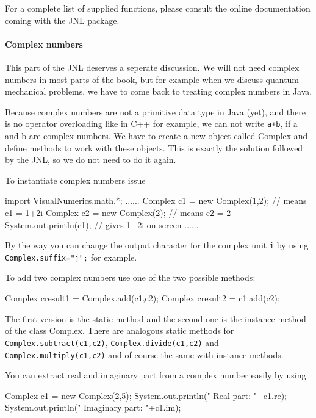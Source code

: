 For a complete list of supplied functions, please consult the online 
documentation coming with the JNL package.

\paragraph{Complex numbers}
This part of the JNL deserves a seperate discussion. We will not need
complex numbers in most parts of the book, but for example when
we discuss quantum mechanical problems, we have to come back to
treating complex numbers in Java.

Because complex numbers are not a primitive data type in Java (yet),
and there is no operator overloading like in C++ for example, we
can not write \verb|a+b|, if a and b are complex numbers. We have to
create a new object called Complex and define methods to work with
these objects. This is exactly the solution followed by the JNL,
so we do not need to do it again.

To instantiate complex numbers issue 
\begin{sverbatim}
import VisualNumerics.math.*;
  ......
  Complex c1 = new Complex(1,2); // means c1 = 1+2i  
  Complex c2 = new Complex(2);   // means c2 = 2  
  System.out.println(c1);  // gives   1+2i  on screen
  ......
\end{sverbatim}
By the way you can change the output character for the complex
unit \verb|i| by using \verb|Complex.suffix="j";| for example.

To add two complex numbers use one of the two possible methods:
\begin{sverbatim}
   Complex cresult1 = Complex.add(c1,c2);
   Complex cresult2 = c1.add(c2);
\end{sverbatim}
The first version is the static method and the second one is
the instance method of the class Complex. There are analogous
static methods for \verb|Complex.subtract(c1,c2)|, \verb|Complex.divide(c1,c2)|
and \verb|Complex.multiply(c1,c2)| and of course the same with
instance methods.

You can extract real and imaginary part from a complex number
easily by using
\begin{sverbatim}
  Complex c1 = new Complex(2,5);
  System.out.println(" Real part: "+c1.re);
  System.out.println(" Imaginary part: "+c1.im);
\end{sverbatim}

